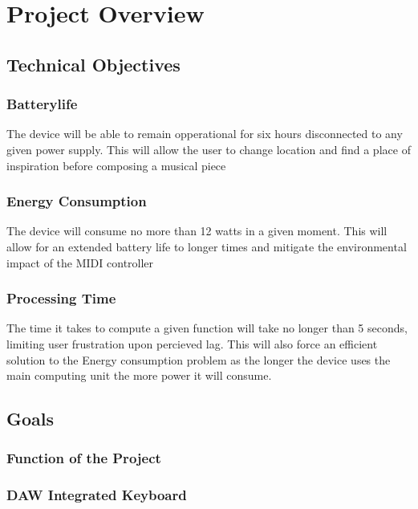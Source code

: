 \section{Project Overview}

\subsection{Technical Objectives}

\subsubsection{Batterylife}

The device will be able to remain opperational for six hours disconnected to any
given power supply. This will allow the user to change location and find a place
of inspiration before composing a musical piece

\subsubsection{Energy Consumption}

The device will consume no more than 12 watts in a given moment. This will allow
for an extended battery life to longer times and mitigate the environmental
impact of the MIDI controller

\subsubsection{Processing Time}

The time it takes to compute a given function will take no longer than 5
seconds, limiting user frustration upon percieved lag. This will also force an
efficient solution to the Energy consumption problem as the longer the device
uses the main computing unit the more power it will consume.

\subsection{Goals}

\subsubsection{Function of the Project}

\subsubsection{DAW Integrated Keyboard}

